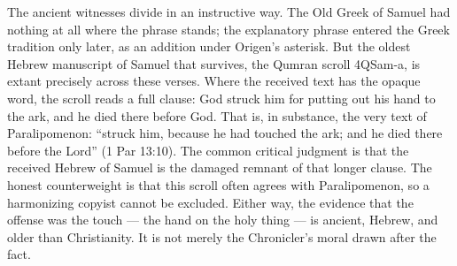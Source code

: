 The ancient witnesses divide in an instructive way. The Old Greek of Samuel
had nothing at all where the phrase stands; the explanatory phrase entered
the Greek tradition only later, as an addition under Origen's
asterisk. But the oldest
Hebrew manuscript of Samuel that survives, the Qumran scroll 4QSam-a, is
extant precisely across these verses. Where the received text has the
opaque word, the scroll reads a full clause: God struck him for putting out
his hand to the ark, and he died there before God. That is, in substance,
the very text of Paralipomenon: ``struck him, because he had touched the ark; and
he died there before the Lord'' (1 Par 13:10). The common critical judgment
is that the received Hebrew of Samuel is the damaged remnant of that longer
clause. The honest counterweight is that this scroll often agrees with
Paralipomenon, so a harmonizing copyist cannot be excluded. Either way, the
evidence that the offense was the touch --- the hand on the holy thing ---
is ancient, Hebrew, and older than Christianity. It is not merely the
Chronicler's moral drawn after the fact.

